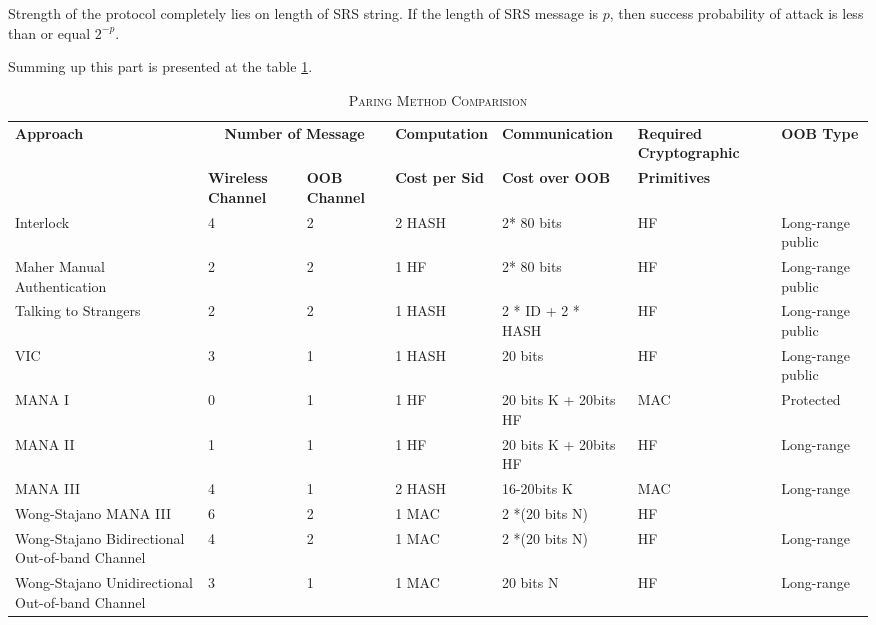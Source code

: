 Strength of the protocol completely lies on length of SRS string. If the length of SRS message is $p$, then success probability of attack is less than or equal $2^{-p}$. 

Summing up this part is presented at the table \ref{paircom}.

\begin{table}[ht] 
\centering
\caption{\textsc{Paring Method Comparision}}
\label{paircom}
{\scriptsize
\begin{tabular}{ | p{2cm} | p{1.4cm} | p{1.4cm} | p{2cm} | p{2.2cm} | p{2cm} | p{2cm}| }
\hline
\textbf{Approach} &\multicolumn{2}{c}{ \textbf{Number of Message}} & \textbf{Computation} & \textbf{Communication} & \textbf{Required Cryptographic} & \textbf{OOB Type}\\ 
 & \textbf{Wireless Channel} & \textbf{OOB Channel} & \textbf{Cost per Sid} & \textbf{Cost over OOB} & \textbf{Primitives} & \\ \hline \hline

Interlock & 4 & 2 & 2 HASH & 2* 80 bits & HF & Long-range public \\ \hline

Maher Manual Authentication & 2 & 2 & 1 HF & 2* 80 bits & HF & Long-range public \\ \hline

Talking to Strangers & 2 &	 2	& 1  HASH &	 2 * ID + 2 * HASH	& HF	&  Long-range public \\ \hline 

VIC & 3	& 1	& 1 HASH 	 & 20 bits & HF & Long-range public \\ \hline 

MANA I	& 0	& 1	& 1 HF & 20 bits K + 20bits HF  & MAC & Protected\\ \hline 

MANA II	& 1	& 1 & 1 HF & 20 bits K + 20bits HF	& HF & Long-range \\ \hline 

MANA III	& 4	& 1 & 2  HASH	& 16-20bits K & MAC & Long-range\\ \hline 

Wong-Stajano MANA III & 6 & 2	& 1 MAC	& 2 *(20 bits N) & HF & \\ \hline 

Wong-Stajano Bidirectional Out-of-band Channel & 4	 & 2	& 1 MAC & 2 *(20 bits N) 	 & HF	 & Long-range\\ \hline 

Wong-Stajano Unidirectional Out-of-band Channel & 3 &	 1	& 1 MAC	 & 20 bits N &	 HF & Long-range \\ \hline 


\end{tabular}}
\end{table}

